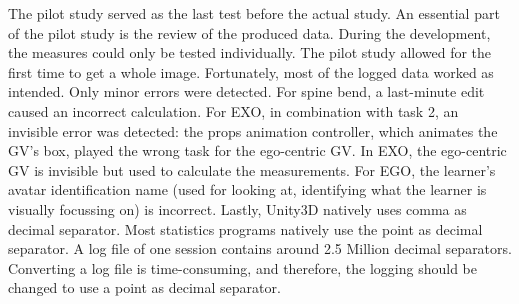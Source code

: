 The pilot study served as the last test before the actual study. An essential part of the pilot study is the review of the produced data. During the development, the measures could only be tested individually. The pilot study allowed for the first time to get a whole image. Fortunately, most of the logged data worked as intended. Only minor errors were detected. For spine bend, a last-minute edit caused an incorrect calculation. For EXO, in combination with task 2, an invisible error was detected: the props animation controller, which animates the GV's box, played the wrong task for the ego-centric GV. In EXO, the ego-centric GV is invisible but used to calculate the measurements. For EGO, the learner's avatar identification name (used for looking at, identifying what the learner is visually focussing on) is incorrect. Lastly, Unity3D natively uses comma as decimal separator. Most statistics programs natively use the point as decimal separator. A log file of one session contains around 2.5 Million decimal separators. Converting a log file is time-consuming, and therefore, the logging should be changed to use a point as decimal separator.

